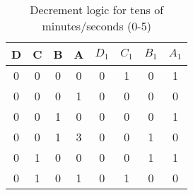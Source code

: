 \begin{table}[ht]
\centering
\caption{Decrement logic for tens of minutes/seconds (0-5)}
\begin{tabular}{|c|c|c|c|c|c|c|c|}
\hline
D & C & B & A & $D_1$ & $C_1$ & $B_1$ & $A_1$ \\ 
\hline
0 & 0 & 0 & 0 & 0 & 1 & 0 & 1 \\
0 & 0 & 0 & 1 & 0 & 0 & 0 & 0 \\
0 & 0 & 1 & 0 & 0 & 0 & 0 & 1 \\
0 & 0 & 1 & 3 & 0 & 0 & 1 & 0 \\
0 & 1 & 0 & 0 & 0 & 0 & 1 & 1 \\
0 & 1 & 0 & 1 & 0 & 1 & 0 & 0 \\
\hline
\end{tabular}
\end{table}
